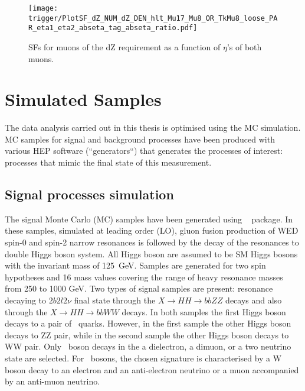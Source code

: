 \begin{figure}[H]
\centering
\texttt{[image: trigger/PlotSF\_dZ\_NUM\_dZ\_DEN\_hlt\_Mu17\_Mu8\_OR\_TkMu8\_loose\_PAR\_eta1\_eta2\_abseta\_tag\_abseta\_ratio.pdf]}
\caption[SFs for muons of the dZ requirement .]{SFs for muons of the dZ requirement as a function of $\eta$'s of both muons.}
\label{fig:trigger_SF_dimu_dZ_H}
\end{figure}

\section{Simulated Samples}
\label{sec:simulated_samples}

The data analysis carried out in this thesis is optimised using the MC simulation. MC samples for signal and background processes have been produced with various HEP software (``generators``) that generates the processes of interest: processes that mimic the final state of this measurement. 

\subsection{Signal processes simulation\label{sec:signalMC}}

%
%
The signal Monte Carlo (MC) samples 
have been generated using {\MGMCatNLO}
~\cite{Alwall:2014hca} package. In these samples, simulated at leading
order (LO), gluon fusion production of WED spin-0 and spin-2 narrow resonances is
followed by the decay of the resonances to double Higgs boson system. All Higgs boson are assumed to be SM Higgs bosons with the invariant mass of 125~GeV. Samples are generated for two spin hypotheses and 16 mass values covering the range of heavy resonance masses from 250 to 1000 GeV. Two types of signal samples are present: resonance decaying to $2b 2l 2\nu$ final state through the $X \rightarrow HH \rightarrow bbZZ$ decays and also through the $X \rightarrow HH \rightarrow bbWW$ decays. In both samples the first Higgs boson decays to a pair of \PQb ~quarks. However, in the first sample the other Higgs boson decays to ZZ pair, while 
in the second sample the other Higgs boson decays to WW pair. Only \PZ ~boson decays in the a dielectron,  a dimuon, or a two neutrino state are selected. For \PW ~bosons, the chosen signature is characterised by a W boson decay to an electron and an anti-electron neutrino or a muon accompanied by an anti-muon neutrino.

